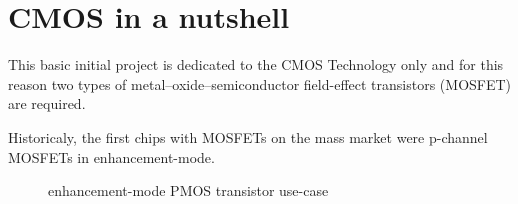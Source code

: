 \section{CMOS in a nutshell}
This basic initial project is dedicated to the CMOS Technology only and for this reason two types of metal–oxide–semiconductor field-effect transistors (MOSFET) are required.

Historicaly, the first chips with MOSFETs on the mass market were p-channel MOSFETs in enhancement-mode.

\begin{center}
	\begin{figure}[h]
		\begin{center}
			\begin{circuitdiagram}{20}{20}
			\end{circuitdiagram}
		\end{center}
		\caption{enhancement-mode PMOS transistor use-case}
	\end{figure}
\end{center}


